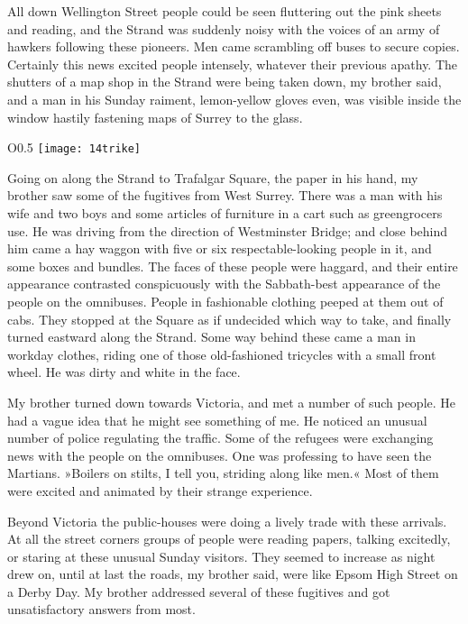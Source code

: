 All down Wellington Street people could be seen fluttering out the pink sheets and reading, and the Strand was suddenly noisy with the voices of an army of hawkers following these pioneers. Men came scrambling off buses to secure copies. Certainly this news excited people intensely, whatever their previous apathy. The shutters of a map shop in the Strand were being taken down, my brother said, and a man in his Sunday raiment, lemon-yellow gloves even, was visible inside the window hastily fastening maps of Surrey to the glass.

\begin{wrapfigure}{O}{0.5\textwidth}
\centering
\texttt{[image: 14trike]}
\end{wrapfigure}

Going on along the Strand to Trafalgar Square, the paper in his hand, my brother saw some of the fugitives from West Surrey. There was a man with his wife and two boys and some articles of furniture in a cart such as greengrocers use. He was driving from the direction of Westminster Bridge; and close behind him came a hay waggon with five or six respectable-looking people in it, and some boxes and bundles. The faces of these people were haggard, and their entire appearance contrasted conspicuously with the Sabbath-best appearance of the people on the omnibuses. People in fashionable clothing peeped at them out of cabs. They stopped at the Square as if undecided which way to take, and finally turned eastward along the Strand. Some way behind these came a man in workday clothes, riding one of those old-fashioned tricycles with a small front wheel. He was dirty and white in the face.

My brother turned down towards Victoria, and met a number of such people. He had a vague idea that he might see something of me. He noticed an unusual number of police regulating the traffic. Some of the refugees were exchanging news with the people on the omnibuses. One was professing to have seen the Martians. »Boilers on stilts, I tell you, striding along like men.« Most of them were excited and animated by their strange experience.

Beyond Victoria the public-houses were doing a lively trade with these arrivals. At all the street corners groups of people were reading papers, talking excitedly, or staring at these unusual Sunday visitors. They seemed to increase as night drew on, until at last the roads, my brother said, were like Epsom High Street on a Derby Day. My brother addressed several of these fugitives and got unsatisfactory answers from most.


